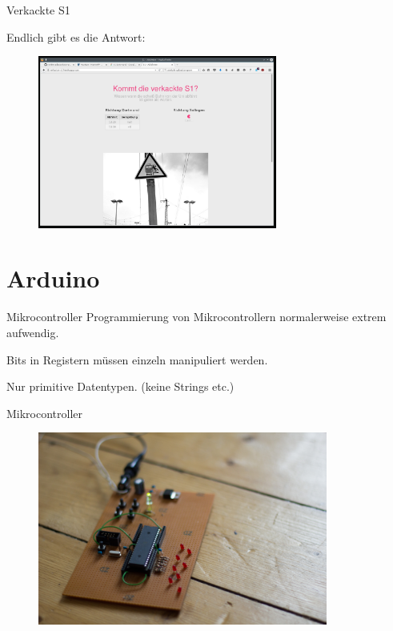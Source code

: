 \documentclass{beamer}
\begin{document}
\begin{frame}[fragile]{Verkackte S1}

  Endlich gibt es die Antwort:

  \begin{figure}[ht]
    \centering
      \includegraphics[width=0.7\textwidth]{pics/screen.jpg}
      \label{fig:screen}
  \end{figure}

\end{frame}

\section{Arduino}
\label{sec:Arduino}

\begin{frame}[fragile]{Mikrocontroller}
  Programmierung von Mikrocontrollern normalerweise extrem aufwendig.

  Bits in Registern müssen einzeln manipuliert werden.

  Nur primitive Datentypen. (keine Strings etc.)
\end{frame}

\begin{frame}[fragile]{Mikrocontroller}
  \begin{figure}[ht]
    \centering
      \includegraphics[width=0.85\textwidth]{pics/avr-1.jpg}
  \end{figure}
\end{frame}
\end{document}
